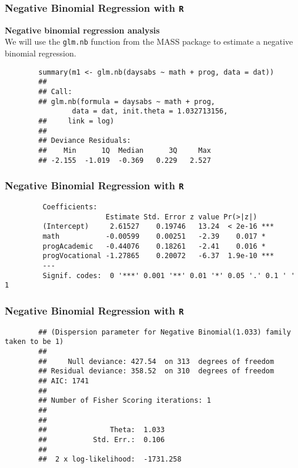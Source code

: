 \documentclass[00-GLMregslides.tex]{subfiles}
\begin{document}
\begin{frame}[fragile]
	\frametitle{Negative Binomial Regression with \texttt{R} }
	\large
	
\textbf{Negative binomial regression analysis}\\
	We will use the \texttt{glm.nb} function from the MASS package to estimate a negative binomial regression.
	
	\begin{framed}
		\begin{verbatim}
		summary(m1 <- glm.nb(daysabs ~ math + prog, data = dat))
		## 
		## Call:
		## glm.nb(formula = daysabs ~ math + prog, 
		        data = dat, init.theta = 1.032713156, 
		##     link = log)
		## 
		## Deviance Residuals: 
		##    Min      1Q  Median      3Q     Max  
		## -2.155  -1.019  -0.369   0.229   2.527  
			\end{verbatim}
		\end{framed}
		
	\end{frame}
	\begin{frame}[fragile]
		\frametitle{Negative Binomial Regression with \texttt{R} }
		\large
		\begin{framed}
		\begin{verbatim} 
		 Coefficients:
		                Estimate Std. Error z value Pr(>|z|)    
		 (Intercept)     2.61527    0.19746   13.24  < 2e-16 ***
		 math           -0.00599    0.00251   -2.39    0.017 *  
		 progAcademic   -0.44076    0.18261   -2.41    0.016 *  
		 progVocational -1.27865    0.20072   -6.37  1.9e-10 ***
		 ---
		 Signif. codes:  0 '***' 0.001 '**' 0.01 '*' 0.05 '.' 0.1 ' ' 1

		\end{verbatim}
	\end{framed}
	
\end{frame}
\begin{frame}[fragile]
	\frametitle{Negative Binomial Regression with \texttt{R} }
	\Large
	\begin{framed}
		\begin{verbatim}
		## (Dispersion parameter for Negative Binomial(1.033) family taken to be 1)
		## 
		##     Null deviance: 427.54  on 313  degrees of freedom
		## Residual deviance: 358.52  on 310  degrees of freedom
		## AIC: 1741
		## 
		## Number of Fisher Scoring iterations: 1
		## 
		## 
		##               Theta:  1.033 
		##           Std. Err.:  0.106 
		## 
		##  2 x log-likelihood:  -1731.258
		\end{verbatim}
	\end{framed}
	
	
\end{frame}
\end{document}
